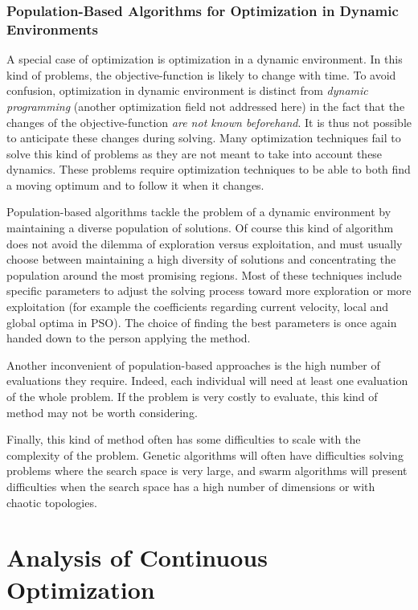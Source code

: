 \subsubsection{Population-Based Algorithms for Optimization in Dynamic Environments}\label{population_based}

A special case of optimization is optimization in a dynamic environment. In this kind of problems, the objective-function is likely to change with time. To avoid confusion, optimization in dynamic environment is distinct from \emph{dynamic programming} (another optimization field not addressed here) in the fact that the changes of the objective-function \emph{are not known beforehand}. It is thus not possible to anticipate these changes during solving.
Many optimization techniques fail to solve this kind of problems as they are not meant to take into account these dynamics. These problems require optimization techniques to be able to both find a moving optimum and to follow it when it changes.

Population-based algorithms tackle the problem of a dynamic environment by maintaining a diverse population of solutions. Of course this kind of algorithm does not avoid the dilemma of exploration versus exploitation, and must usually choose between maintaining a high diversity of solutions and concentrating the population around the most promising regions. Most of these techniques include specific parameters to adjust the solving process toward more exploration or more exploitation (for example the coefficients regarding current velocity, local and global optima in PSO). The choice of finding the best parameters is once again handed down to the person applying the method.

Another inconvenient of population-based approaches is the high number of evaluations they require. Indeed, each individual will need at least one evaluation of the whole problem. If the problem is very costly to evaluate, this kind of method may not be worth considering.

Finally, this kind of method often has some difficulties to scale with the complexity of the problem. Genetic algorithms will often have difficulties solving problems where the search space is very large, and swarm algorithms will present difficulties when the search space has a high number of dimensions or with chaotic topologies.

\section{Analysis of Continuous Optimization}

